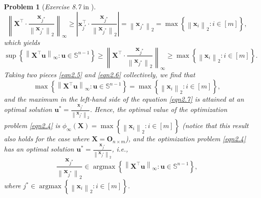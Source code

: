 \documentclass[11pt]{article}
\newtheorem{problem}{Problem}
\DeclareMathOperator*{\argmax}{argmax}
\numberwithin{equation}{problem}
\begin{document}
\begin{problem} [\emph{Exercise 8.7} in \cite{calafiore2014optimization}]
{\begin{equation*}
    \left\| \mathbf{X}^{\top} \cdot \frac{\mathbf{x}_{j^*}}{\left\| \mathbf{x}_{j^*} \right\|_2} \right\|_{\infty} \geq 
    \left| \mathbf{x}_{j^*}^{\top} \cdot \frac{\mathbf{x}_{j^*}}{\left\| \mathbf{x}_{j^*} \right\|_2} \right| 
    = \left\| \mathbf{x}_{j^*} \right\|_2
    = \max \left\{ \left\| \mathbf{x}_i \right\|_2 : i \in [m] \right\},
\end{equation*}
which yields
\begin{equation}
    \label{eqn2.6}
    \sup \left\{ \left\| \mathbf{X}^{\top} \mathbf{u} \right\|_{\infty} : \mathbf{u} \in \mathbb{S}^{n-1} \right\} \geq \left\| \mathbf{X}^{\top} \cdot \frac{\mathbf{x}_{j^*}}{\left\| \mathbf{x}_{j^*} \right\|_2} \right\|_{\infty} 
    \geq \max \left\{ \left\| \mathbf{x}_i \right\|_2 : i \in [m] \right\}.
\end{equation}
Taking two pieces \eqref{eqn2.5} and \eqref{eqn2.6} collectively, we find that
\begin{equation}
    \label{eqn2.7}
    \max \left\{ \left\| \mathbf{X}^{\top} \mathbf{u} \right\|_{\infty} : \mathbf{u} \in \mathbb{S}^{n-1} \right\} = \max \left\{ \left\| \mathbf{x}_{i} \right\|_{2} : i \in [m] \right\},
\end{equation}
and the maximum in the left-hand side of the equation \eqref{eqn2.7} is attained at an optimal solution $\mathbf{u}^* = \frac{\mathbf{x}_{j^*}}{\left\| \mathbf{x}_{j^*} \right\|_2}$. Hence, the optimal value of the optimization problem \eqref{eqn2.4} is $\phi_{\infty}(\mathbf{X}) = \max \left\{ \left\| \mathbf{x}_{i} \right\|_{2} : i \in [m] \right\}$ (notice that this result also holds for the case where $\mathbf{X} = \mathbf{O}_{n \times m}$), and the optimization problem \eqref{eqn2.4} has an optimal solution $\mathbf{u}^* = \frac{\mathbf{x}_{j^*}}{\left\| \mathbf{x}_{j^*} \right\|_2}$, \emph{i.e.},
\begin{equation*}
    \frac{\mathbf{x}_{j^*}}{\left\| \mathbf{x}_{j^*} \right\|_2} \in \argmax  \left\{ \left\| \mathbf{X}^{\top} \mathbf{u} \right\|_{\infty} : \mathbf{u} \in \mathbb{S}^{n-1} \right\},
\end{equation*}
where $j^* \in \argmax \left\{ \left\| \mathbf{x}_i \right\|_2 : i \in [m] \right\}$.
\medskip

}
\end{problem}
\end{document}
